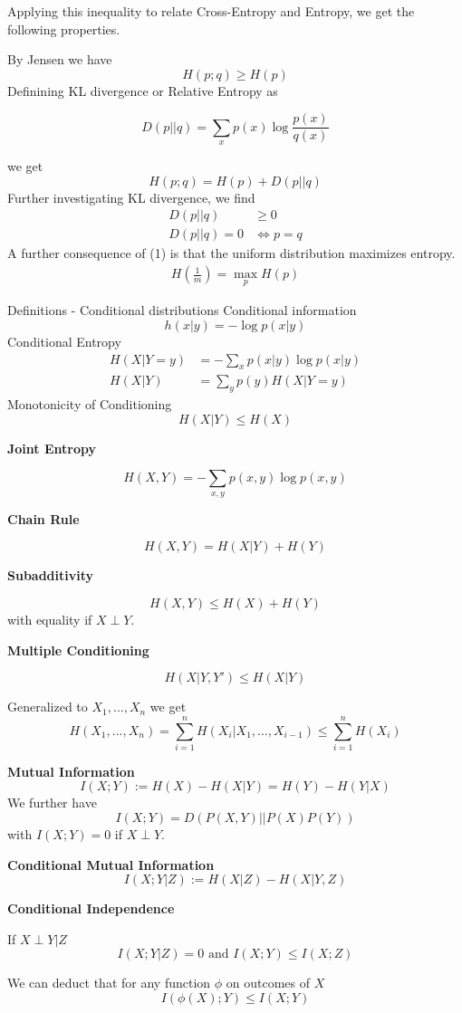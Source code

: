 Applying this inequality to relate Cross-Entropy and Entropy, we get the following properties.

    By Jensen we have \[H(p; q) \geq H(p)\]
    Definining KL divergence or Relative Entropy as
    \begin{mainbox}{}
    \[D(p || q) = \sum_{x} p(x) \log \frac{p(x)}{q(x)}\]
    \end{mainbox}
    we get
    \[H(p; q) = H(p) + D(p || q)\]
    Further investigating KL divergence, we find 
    \begin{align}
        D(p||q) &\geq 0\\
        D(p||q) = 0 &\iff p = q
    \end{align}
    A further consequence of (1) is that the uniform distribution maximizes entropy.
    \begin{align*}
        H\left(\frac{1}{m}\right) = \max_{p}H(p)
    \end{align*}
    \begin{mainbox}
        {Definitions - Conditional distributions}
        Conditional information
        \[h(x|y) = - \log p(x|y)\]
        Conditional Entropy
        \begin{align*}
            H(X | Y = y) &= - \sum_{x}p(x|y) \log p(x|y)\\
            H(X|Y) &= \sum_{y} p(y)H(X|Y = y)
        \end{align*}
        Monotonicity of Conditioning
        \[H(X|Y) \leq H(X)\]
    \end{mainbox}
    \textbf{Joint Entropy}

    \[H(X, Y) = - \sum_{x, y}p(x,y) \log p(x, y)\]

    \textbf{Chain Rule}

    \[H(X, Y) = H(X | Y) + H(Y)\]

    \textbf{Subadditivity}

    \[H(X, Y) \leq H(X) + H(Y)\]
    with equality if \(X \perp Y\).

    \textbf{Multiple Conditioning}

    \[H(X | Y, Y') \leq H(X|Y)\]

    Generalized to \(X_1, ..., X_n\) we get
    \[H(X_1, ..., X_n) = \sum_{i = 1}^n H(X_i | X_1, ..., X_{i-1}) \leq \sum_{i = 1}^n H(X_i)\]

    \textbf{Mutual Information}
    \[I(X; Y) := H(X) - H(X|Y) = H(Y) - H(Y|X)\]
    We further have 
    \[I(X; Y) = D(P(X, Y) || P(X)P(Y))\]
    with \(I(X;Y) = 0\) if \(X \perp Y\).

    \textbf{Conditional Mutual Information}
    \[I(X; Y|Z) := H(X|Z) - H(X|Y, Z)\]

    \textbf{Conditional Independence}
    
    If \(X \perp Y|Z\) 
    \[I(X; Y | Z) = 0 \text{ and }I(X;Y) \leq I(X;Z)\]

    We can deduct that for any function \(\phi\) on outcomes of \(X\)
    \[I(\phi(X); Y) \leq I(X;Y)\]





